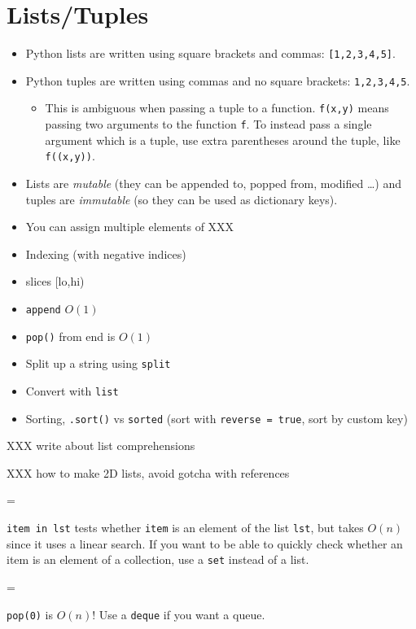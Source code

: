\documentclass[10pt]{book}
\newcommand{\py}[1]{\texttt{#1}}
\newenvironment{warning}
{\par\begin{mdframed}[linewidth=2pt,linecolor=red]%
    \begin{list}{}{\leftmargin=1cm
        \labelwidth=\leftmargin}\item[\Large\ding{43}]}
    {\end{list}\end{mdframed}\par}
\begin{document}
\section{Lists/Tuples}

\begin{itemize}
\item Python lists are written using square brackets and commas:
  \py{[1,2,3,4,5]}.
\item Python tuples are written using commas and no square brackets:
  \py{1,2,3,4,5}.
  \begin{itemize}
  \item This is ambiguous when passing a tuple to a function.
    \py{f(x,y)} means passing two arguments to the function \py{f}.
    To instead pass a single argument which is a tuple, use extra
    parentheses around the tuple, like \py{f((x,y))}.
  \end{itemize}
\item Lists are \emph{mutable} (they can be appended to, popped from,
  modified \dots) and tuples are \emph{immutable} (so they can be used as
  dictionary keys).
\item You can assign multiple elements of XXX
\item Indexing (with negative indices)
\item slices [lo,hi)
\item \py{append} $O(1)$
\item \py{pop()} from end is $O(1)$
\item Split up a string using \py{split}
\item Convert with \py{list}
\item Sorting, \py{.sort()} vs \py{sorted} (sort with \py{reverse =
    true}, sort by custom key)
\end{itemize}

XXX write about list comprehensions

XXX how to make 2D lists, avoid gotcha with references

\begin{warning}
  \py{item in lst} tests whether \py{item} is an element of the
  list \py{lst}, but takes $O(n)$ since it uses a linear search.  If
  you want to be able to quickly check whether an item is an element
  of a collection, use a \py{set} instead of a list.
\end{warning}

\begin{warning}
  \py{pop(0)} is $O(n)$! Use a \py{deque} if you want a queue.
\end{warning}
\end{document}
